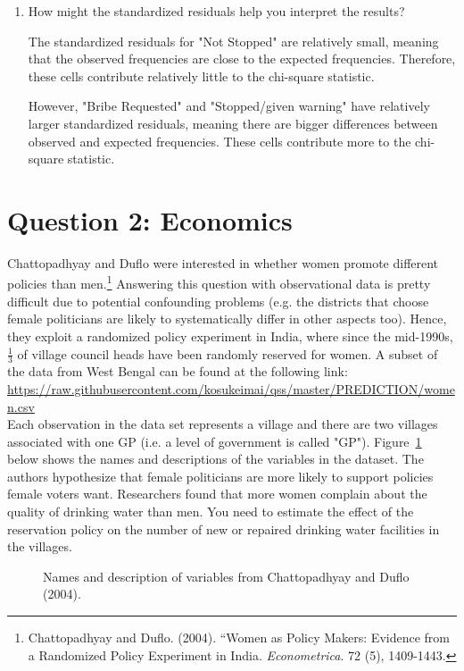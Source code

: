 \documentclass[12pt,letterpaper]{article}
\begin{document}
\begin{enumerate}
	
	\vspace{7cm}
	\item [(d)] How might the standardized residuals help you interpret the results?  \\
	\begin{doublespace}
		The standardized residuals for "Not Stopped" are relatively small, meaning that the observed frequencies are close to the expected frequencies. Therefore, these cells contribute relatively little to the chi-square statistic.
		
		However, "Bribe Requested" and "Stopped/given warning" have relatively larger standardized residuals, meaning there are bigger differences between observed and expected frequencies. These cells contribute more to the chi-square statistic.
	\end{doublespace}
	
\end{enumerate}
\newpage

\section*{Question 2: Economics}
Chattopadhyay and Duflo were interested in whether women promote different policies than men.\footnote{Chattopadhyay and Duflo. (2004). ``Women as Policy Makers: Evidence from a Randomized Policy Experiment in India. \textit{Econometrica}. 72 (5), 1409-1443.} Answering this question with observational data is pretty difficult due to potential confounding problems (e.g. the districts that choose female politicians are likely to systematically differ in other aspects too). Hence, they exploit a randomized policy experiment in India, where since the mid-1990s, $\frac{1}{3}$ of village council heads have been randomly reserved for women. A subset of the data from West Bengal can be found at the following link: \url{https://raw.githubusercontent.com/kosukeimai/qss/master/PREDICTION/women.csv}\\

\noindent Each observation in the data set represents a village and there are two villages associated with one GP (i.e. a level of government is called "GP"). Figure~\ref{fig:women_desc} below shows the names and descriptions of the variables in the dataset. The authors hypothesize that female politicians are more likely to support policies female voters want. Researchers found that more women complain about the quality of drinking water than men. You need to estimate the effect of the reservation policy on the number of new or repaired drinking water facilities in the villages.
\vspace{.5cm}
\begin{figure}[h!]
	\caption{\footnotesize{Names and description of variables from Chattopadhyay and Duflo (2004).}}
	\vspace{.5cm}
	\centering
	\label{fig:women_desc}
\end{figure}		
\end{document}
